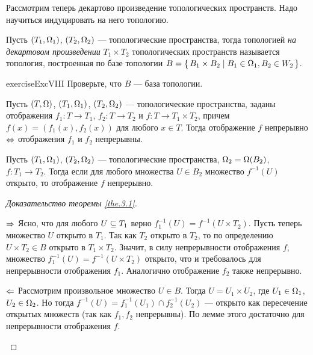 \documentclass[main]{subfiles}
\begin{document}
Рассмотрим теперь декартово произведение топологических пространств. Надо научиться индуцировать на него топологию.

\begin{definition}
	Пусть $ (T_1, \Omega_1) $, $ (T_2, \Omega_2) $ --- топологические пространства, тогда топологией \emph{на декартовом произведении} $ T_1 \times T_2 $ топологических пространств называется топология, построенная по базе топологии
	$ B = \left\{\, B_1 \times B_2 \mid B_1 \in \Omega_1, B_2 \in W_2 \,\right\} $.
\end{definition}

\begin{restatable}{exercise}{ExcVIII}
	Проверьте, что $ B $ --- база топологии.
\end{restatable}

\begin{theorem} \label{the.3.1}
	Пусть $ (T, \Omega) $, $ (T_1, \Omega_1) $, $ (T_2,\Omega_2) $ --- топологические пространства, заданы отображения
	$ f_1 \colon T \to T_1 $, $ f_2 \colon T \to T_2 $ и $ f \colon T \to T_1 \times T_2 $,
	причем $ f(x) = (f_1(x), f_2(x)) $ для любого $ x \in T $. Тогда отображение $ f $ непрерывно
	$\Leftrightarrow$ отображения $ f_1 $ и $ f_2 $ непрерывны.
\end{theorem}

\begin{lemma} \label{lem.3.1}
	Пусть $ (T_1, \Omega_1) $, $ (T_2, \Omega_2) $ --- топологические пространства, $ \Omega_2 = \Omega(B_2) $,
	$ f \colon T_1 \to T_2 $. Тогда если для любого множества $ U \in B_2 $ множество $ f^{-1}(U) $ открыто,
	то отображение $ f $ непрерывно.
\end{lemma}

\begin{proof}[Доказательство теоремы \ref{the.3.1}] \leavevmode
	\begin{multiproof}
		\item[$\Rightarrow$] Ясно, что для любого $ U \subseteq T_1 $ верно $ f^{-1}_1(U) = f^{-1}( U \times T_2 ) $. Пусть
			теперь множество $ U $ открыто в $ T_1 $. Так как $ T_2 $ открыто в $ T_2 $, то по определению
			$ U \times T_2 \in B $ открыто в $ T_1 \times T_2 $. Значит, в силу непрерывности отображения $ f $,
			множество $ f^{-1}_1(U) = f^{-1}( U \times T_2 ) $ открыто, что и требовалось для непрерывности
			отображения $ f_1 $. Аналогично отображение $ f_2 $ также непрерывно.
		\item[$\Leftarrow$] Рассмотрим произвольное множество $ U \in B $. Тогда $ U = U_1 \times U_2 $, где $ U_1 \in \Omega_1 $,
			$ U_2 \in \Omega_2 $. Но тогда $ f^{-1}(U) = f^{-1}_1(U_1) \cap f^{-1}_2(U_2) $ --- открыто как пересечение
			открытых множеств (так как $ f_1, f_2 $ непрерывны). По лемме этого достаточно для непрерывности
			отображения $ f $.
	\end{multiproof}
\end{proof}
\end{document}

